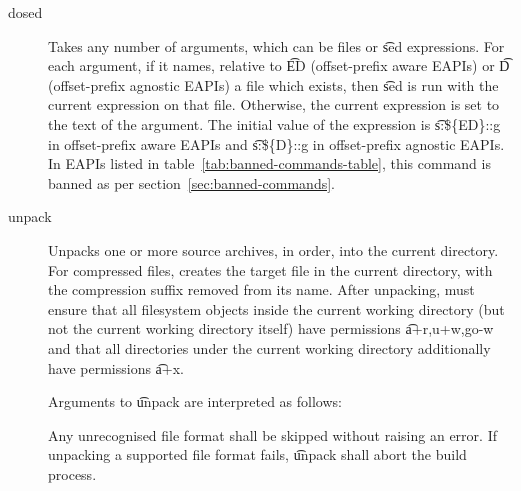 \begin{description}
\item[dosed] Takes any number of arguments, which can be files or \t{sed} expressions. For each
    argument, if it names, relative to \t{ED} (offset-prefix aware EAPIs) or \t{D} (offset-prefix
    agnostic EAPIs) a file which exists, then \t{sed} is run with the current expression on that
    file. Otherwise, the current expression is set to the text of the argument. The initial value
    of the expression is \t{s:\$\{ED\}::g} in offset-prefix aware EAPIs and \t{s:\$\{D\}::g} in
    offset-prefix agnostic EAPIs. In EAPIs listed in table~\ref{tab:banned-commands-table}, this
    command is banned as per section~\ref{sec:banned-commands}.

\item[unpack] Unpacks one or more source archives, in order, into the current directory.
    For compressed files, creates the target file in the current directory, with the compression
    suffix removed from its name. After unpacking, must ensure that all filesystem objects inside
    the current working directory (but not the current working directory itself) have permissions
    \t{a+r,u+w,go-w} and that all directories under the current working directory additionally have
    permissions \t{a+x}.

    Arguments to \t{unpack} are interpreted as follows:

    Any unrecognised file format shall be skipped without raising an error. If unpacking a supported
    file format fails, \t{unpack} shall abort the build process.


\end{description}
